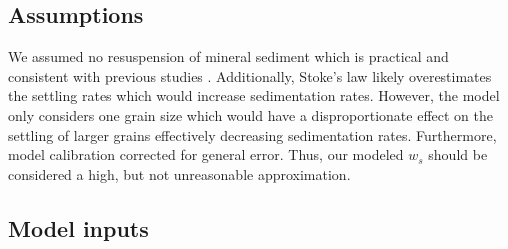 \subsection{Assumptions}
We assumed no resuspension of mineral sediment which is practical and consistent with previous studies \citep{kroneMethodSimulatingMarsh1987, allenSaltmarshGrowthStratification1990, frenchNumericalSimulationVertical1993, temmermanModellingLongtermTidal2003, temmermanModellingEstuarineVariations2004}. Additionally, Stoke's law likely overestimates the settling rates which would increase sedimentation rates. However, the model only considers one grain size which would have a disproportionate effect on the settling of larger grains effectively decreasing sedimentation rates. Furthermore, model calibration corrected for general error. Thus, our modeled $w_s$ should be considered a high, but not unreasonable approximation.

\subsection{Model inputs}





